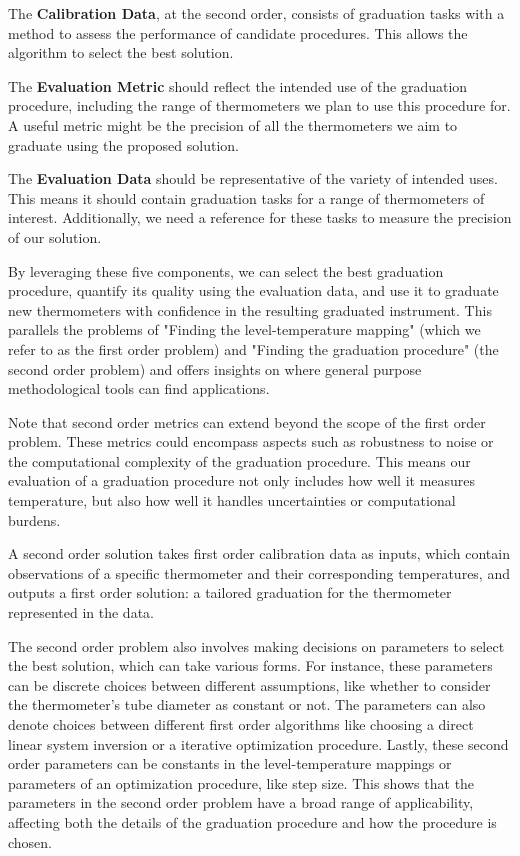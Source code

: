 \begin{bibunit}
The \textbf{Calibration Data}, at the second order, consists of graduation tasks with a method to assess the performance of candidate procedures. This allows the algorithm to select the best solution.

The \textbf{Evaluation Metric} should reflect the intended use of the graduation procedure, including the range of thermometers we plan to use this procedure for. A useful metric might be the precision of all the thermometers we aim to graduate using the proposed solution.

The \textbf{Evaluation Data} should be representative of the variety of intended uses. This means it should contain graduation tasks for a range of thermometers of interest. Additionally, we need a reference for these tasks to measure the precision of our solution.

By leveraging these five components, we can select the best graduation procedure, quantify its quality using the evaluation data, and use it to graduate new thermometers with confidence in the resulting graduated instrument. This parallels the problems of "Finding the level-temperature mapping" (which we refer to as the first order problem) and "Finding the graduation procedure" (the second order problem) and offers insights on where general purpose methodological tools can find applications.

Note that second order metrics can extend beyond the scope of the first order problem. These metrics could encompass aspects such as robustness to noise or the computational complexity of the graduation procedure. This means our evaluation of a graduation procedure not only includes how well it measures temperature, but also how well it handles uncertainties or computational burdens.

A second order solution takes first order calibration data as inputs, which contain observations of a specific thermometer and their corresponding temperatures, and outputs a first order solution: a tailored graduation for the thermometer represented in the data.

The second order problem also involves making decisions on parameters to select the best solution, which can take various forms. For instance, these parameters can be discrete choices between different assumptions, like whether to consider the thermometer's tube diameter as constant or not. The parameters can also denote choices between different first order algorithms like choosing a direct linear system inversion or a iterative optimization procedure. Lastly, these second order parameters can be constants in the level-temperature mappings or parameters of an optimization procedure, like step size. This shows that the parameters in the second order problem have a broad range of applicability, affecting both the details of the graduation procedure and how the procedure is chosen.


\end{bibunit}

